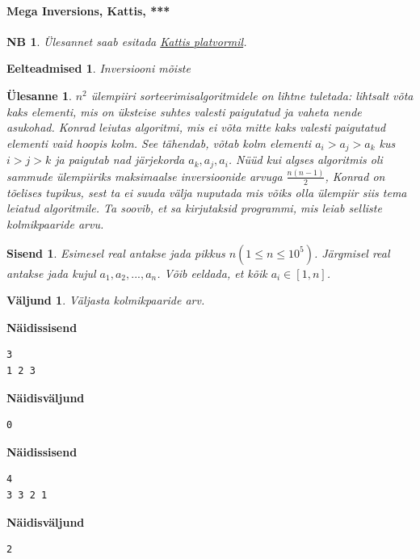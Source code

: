 \documentclass{trkut}
\newtheorem*{prereq}{Eelteadmised}
\newtheorem*{extra}{NB}
\newtheorem*{Input}{Sisend}
\newtheorem*{Output}{Väljund}
\newtheorem*{Text}{Ülesanne}
\begin{document}
\paragraph{Mega Inversions, Kattis, ***}
\begin{extra}
Ülesannet saab esitada \href{https://open.kattis.com/problems/megainversions}{Kattis platvormil}.
\end{extra}
\begin{prereq}
Inversiooni mõiste
\end{prereq}
\begin{Text}
$n^2$ ülempiiri sorteerimisalgoritmidele on lihtne tuletada: lihtsalt võta kaks elementi, mis on üksteise suhtes valesti paigutatud ja vaheta nende asukohad.
Konrad leiutas algoritmi, mis ei võta mitte kaks valesti paigutatud elementi vaid hoopis kolm. See tähendab, võtab kolm elementi $a_i>a_j>a_k$ kus $i>j>k$ ja paigutab nad järjekorda $a_k, a_j, a_i$. Nüüd kui algses algoritmis oli sammude ülempiiriks maksimaalse inversioonide arvuga $\frac{n(n-1)}{2}$, Konrad on tõelises tupikus, sest ta ei suuda välja nuputada mis võiks olla ülempiir siis tema leiatud algoritmile. Ta soovib, et sa kirjutaksid programmi, mis leiab selliste kolmikpaaride arvu.

\parencite{19}
\end{Text}
\begin{Input}
Esimesel real antakse jada pikkus $n$$(1\le n\le 10^5)$.
Järgmisel real antakse jada kujul $a_1, a_2, ..., a_n$. 
Võib eeldada, et kõik $a_i\in[1,n]$.
\end{Input}
\begin{Output}
Väljasta kolmikpaaride arv.
\end{Output}


\textbf{Näidissisend}

\begin{verbatim}
3
1 2 3
\end{verbatim}

\textbf{Näidisväljund}

\begin{verbatim}
0
\end{verbatim}





\textbf{Näidissisend}

\begin{verbatim}
4
3 3 2 1
\end{verbatim}

\textbf{Näidisväljund}

\begin{verbatim}
2
\end{verbatim}
\end{document}
